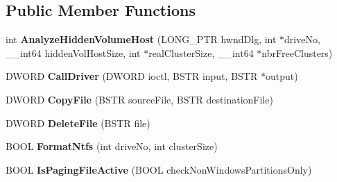 \subsection*{Public Member Functions}
\begin{DoxyCompactItemize}
\item 
\mbox{\label{interface_gost_crypt_format_com_1_1_i_gost_crypt_format_com_ae2fad02e623f45862687ed1034739415}} 
int {\bfseries Analyze\+Hidden\+Volume\+Host} (L\+O\+N\+G\+\_\+\+P\+TR hwnd\+Dlg, int $\ast$drive\+No, \+\_\+\+\_\+int64 hidden\+Vol\+Host\+Size, int $\ast$real\+Cluster\+Size, \+\_\+\+\_\+int64 $\ast$nbr\+Free\+Clusters)
\item 
\mbox{\label{interface_gost_crypt_format_com_1_1_i_gost_crypt_format_com_aeb2907ecc74db2873a9f61ace149018d}} 
D\+W\+O\+RD {\bfseries Call\+Driver} (D\+W\+O\+RD ioctl, B\+S\+TR input, B\+S\+TR $\ast$output)
\item 
\mbox{\label{interface_gost_crypt_format_com_1_1_i_gost_crypt_format_com_ac2d6753c8cd08570899483ff38c1fb99}} 
D\+W\+O\+RD {\bfseries Copy\+File} (B\+S\+TR source\+File, B\+S\+TR destination\+File)
\item 
\mbox{\label{interface_gost_crypt_format_com_1_1_i_gost_crypt_format_com_a57f4684e06f3e4512941dc988b598e55}} 
D\+W\+O\+RD {\bfseries Delete\+File} (B\+S\+TR file)
\item 
\mbox{\label{interface_gost_crypt_format_com_1_1_i_gost_crypt_format_com_a281fc8213a7e1c8bc45696b632ecde90}} 
B\+O\+OL {\bfseries Format\+Ntfs} (int drive\+No, int cluster\+Size)
\item 
\mbox{\label{interface_gost_crypt_format_com_1_1_i_gost_crypt_format_com_a182a36466910c5760c13c86965ebbeeb}} 
B\+O\+OL {\bfseries Is\+Paging\+File\+Active} (B\+O\+OL check\+Non\+Windows\+Partitions\+Only)
\item 
\mbox{\label{interface_gost_crypt_format_com_1_1_i_gost_crypt_format_com_a4b86b072ea31ce596be71d0a80d685f1}} 

\end{DoxyCompactItemize}
